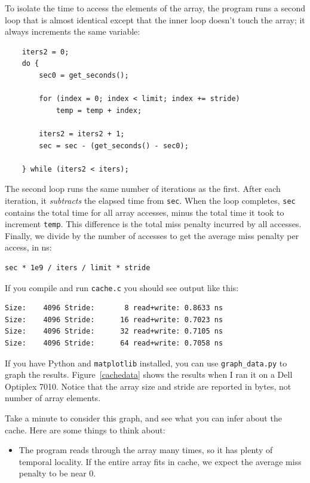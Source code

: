 \documentclass[12pt]{book}
\begin{document}
{To isolate the time to access the elements of the array,
the program runs a second loop that is almost identical except
that the inner loop doesn't touch the array; it always increments
the same variable:

\begin{verbatim}
    iters2 = 0;
    do {
        sec0 = get_seconds();
        
        for (index = 0; index < limit; index += stride) 
            temp = temp + index;
        
        iters2 = iters2 + 1;
        sec = sec - (get_seconds() - sec0);

    } while (iters2 < iters);
\end{verbatim}

The second loop runs the same number of iterations as the first.
After each iteration, it {\em subtracts} the elapsed time from
{\tt sec}.  When the loop completes, {\tt sec} contains the total
time for all array accesses, minus the total time it took to increment
{\tt temp}.  This difference is the total miss penalty incurred by
all accesses.  Finally, we divide by the number of accesses to
get the average miss penalty per access, in ns:

\begin{verbatim}
sec * 1e9 / iters / limit * stride
\end{verbatim}

If you compile and run {\tt cache.c} you should see output like this:

\begin{verbatim}
Size:    4096 Stride:       8 read+write: 0.8633 ns
Size:    4096 Stride:      16 read+write: 0.7023 ns
Size:    4096 Stride:      32 read+write: 0.7105 ns
Size:    4096 Stride:      64 read+write: 0.7058 ns
\end{verbatim}

If you have Python and {\tt matplotlib} installed, you can use
\verb"graph_data.py" to graph the results.  Figure~\ref{cachedata}
shows the results when I ran it on a Dell Optiplex 7010.
Notice that the array size and stride are reported in
bytes, not number of array elements.

Take a minute to consider this graph, and see what you can infer
about the cache.  Here are some things to think about:

\begin{itemize}

\item The program reads through the array many times, so it has plenty
  of temporal locality.  If the entire array fits in cache, we expect
  the average miss penalty to be near 0.


\end{itemize}}
\end{document}
